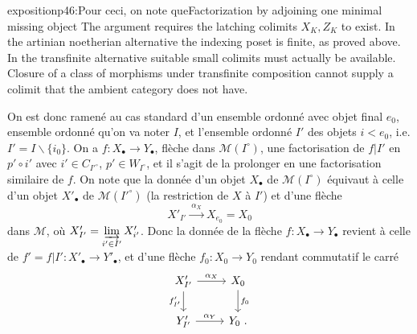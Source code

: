 \begin{dcomment}{exposition}{p46:Pour ceci, on note que}{Factorization by adjoining one minimal missing object}
The argument requires the latching colimits $X_K,Z_K$ to exist. In the artinian noetherian alternative the indexing poset is finite, as proved above. In the transfinite alternative suitable small colimits must actually be available. Closure of a class of morphisms under transfinite composition cannot supply a colimit that the ambient category does not have.
\end{dcomment}


On est donc ramené au cas standard d'un ensemble ordonné avec objet final $e_0$, ensemble ordonné qu'on va noter $I$, et l'ensemble ordonné $I'$ des objets $i<e_0$, i.e. $I'=I\backslash\{i_0\}$. %
On a $f:X_\bullet\longrightarrow Y_\bullet$, flèche dans $\mathcal{M}(I^\circ)$, une factorisation de $f|I'$ en $p'\circ i'$ avec $i'\in C_{I'^\circ}$, $p'\in W_{I^\circ}$, %
et il s'agit de la prolonger en une factorisation similaire de $f$. On note que la donnée d'un objet $X_\bullet$ de $\mathcal{M}(I^\circ)$ équivaut à celle d'un objet $X'_\bullet$ de $\mathcal{M}(I'^\circ)$ (la restriction de $X$ à $I'$) et d'une flèche
\[
X'_{I'} \xrightarrow{\ \alpha_X\ } X_{e_0}=X_0
\]
dans $\mathcal{M}$, où $X'_{I'}=\varinjlim\limits_{i'\in I'}X'_{i'}$. Donc la donnée de la flèche $f:X_\bullet\longrightarrow Y_\bullet$ revient à celle de $f'=f|I':X'_\bullet\longrightarrow Y'_\bullet$, et d'une flèche $f_0:X_0\longrightarrow Y_0$ rendant commutatif le carré
\[
\begin{tikzcd}
X'_{I'} \arrow[r, "\alpha_X"] \arrow[d, "f'_{I'}"'] & X_0 \arrow[d, "f_0"] \\
Y'_{I'} \arrow[r, "\alpha_Y"] & Y_0\ .
\end{tikzcd}
\]


